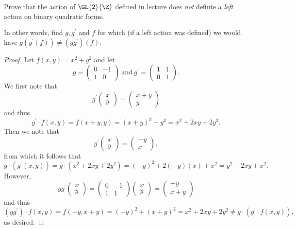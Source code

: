 \documentclass[10pt]{amsart}
\begin{document}
\begin{thm}
  Prove that the action of $\GL{2}{\Z}$ defined in lecture does {\it not} definte a {\it left} action on binary quadratic forms.

  In other words, find $g, g^\prime$ and $f$ for which (if a left action was defined) we would have $g(g^\prime(f)) \neq (gg^\prime)(f)$.
  
  \begin{proof}
    Let $f(x,y) = x^2 + y^2$ and let
    $$g = \left(\begin{array}{cc}
      0 & -1\\
      1 & 0
    \end{array}\right)\ \text{and}\ 
    g^\prime = \left(\begin{array}{cc}
      1 & 1\\
      0 & 1
    \end{array}\right).$$
    We first note that 
    $$g^\prime \left(\begin{array}{c}
      x\\
      y
      \end{array}\right) = \left(\begin{array}{c}x + y\\y\end{array}\right)$$
    and thus
    $$g^\prime \cdot f(x,y) = f(x + y, y) = (x+y)^2 + y^2 = x^2 + 2xy + 2y^2.$$
    Then we note that
    $$g^\prime \left(\begin{array}{c}
      x\\
      y
      \end{array}\right) = \left(\begin{array}{c} -y \\ x \end{array}\right),$$
    from which it follows that
    $$g\cdot (g^\prime(x,y)) = g \cdot (x^2 + 2xy + 2y^2) = (-y)^2 + 2(-y)(x) + x^2 = y^2 - 2xy + x^2.$$
    However,
    $$gg^\prime \left(\begin{array}{c}
      x\\
      y
      \end{array}\right) = \left(\begin{array}{cc}
      0 & -1\\
      1 & 1
    \end{array}\right)\left(\begin{array}{c}
      x\\
      y
      \end{array}\right) = \left(\begin{array}{c}
      -y\\
      x + y
    \end{array}\right) 
    $$
    and thus
    $$(gg^\prime) \cdot f(x,y) = f(-y, x + y) = (-y)^2 + (x + y)^2 = x^2 + 2xy + 2y^2 \neq g \cdot (g^\prime \cdot f(x,y)),$$
    as desired.    
  \end{proof}
\end{thm}
\end{document}
